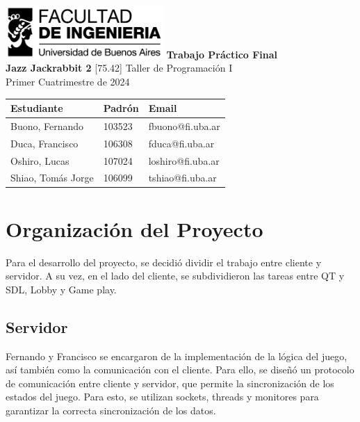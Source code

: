 \documentclass[titlepage,a4paper]{article}
\begin{document}
\begin{titlepage} %
	\hfill\includegraphics[width=6cm]{logofiuba.jpg}
    \centering
    \vfill
    \Huge \textbf{Trabajo Práctico Final\\Jazz Jackrabbit 2}
    \vskip2cm
    \Large [75.42] Taller de Programación I\\
    Primer Cuatrimestre de 2024
    \vfill
    \begin{tabular}{ | l | l | l | } %
      \hline
      \textbf{Estudiante} & \textbf{Padrón} & \textbf{Email} \\ \hline
      Buono, Fernando & 103523 & fbuono@fi.uba.ar \\ \hline
      Duca, Francisco & 106308 & fduca@fi.uba.ar \\ \hline
      Oshiro, Lucas & 107024 & loshiro@fi.uba.ar \\ \hline
      Shiao, Tomás Jorge & 106099 & tshiao@fi.uba.ar \\ \hline
  	\end{tabular}
    \vfill
    \vfill
\end{titlepage}

\clearpage\pagestyle{empty}
\tableofcontents %
\newpage
\setcounter{page}{1}
\pagestyle{fancy}
\setcounter{secnumdepth}{5}
\setcounter{tocdepth}{5}
\section{Organización del Proyecto}
Para el desarrollo del proyecto, se decidió dividir el trabajo entre cliente y servidor. A su vez, en el lado del cliente, se subdividieron las tareas entre QT y SDL, Lobby y Game play. 

\subsection{Servidor}
Fernando y Francisco se encargaron de la implementación de la lógica del juego, así también como la comunicación con el cliente. Para ello, se diseñó un protocolo de comunicación entre cliente y servidor, que permite la sincronización de los estados del juego. Para esto, se utilizan sockets, threads y monitores para garantizar la correcta sincronización de los datos.
\end{document}
